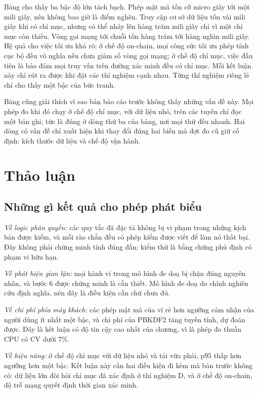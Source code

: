 Bảng cho thấy ba bậc độ lớn tách bạch. Phép mật mã tốn cỡ micro giây tới một mili giây, nên không bao giờ là điểm nghẽn. Truy cập cơ sở dữ liệu tốn vài mili giây khi có chỉ mục, nhưng có thể nhảy lên hàng trăm mili giây chỉ vì một chỉ mục còn thiếu. Vòng gọi mạng tới chuỗi tốn hàng trăm tới hàng nghìn mili giây. Hệ quả cho việc tối ưu khá rõ: ở chế độ on-chain, mọi công sức tối ưu phép tính cục bộ đều vô nghĩa nếu chưa giảm số vòng gọi mạng; ở chế độ chỉ mục, việc đầu tiên là bảo đảm mọi truy vấn trên đường xác minh đều có chỉ mục. Mỗi kết luận này chỉ rút ra được khi đặt các thí nghiệm cạnh nhau. Từng thí nghiệm riêng lẻ chỉ cho thấy một bậc của bức tranh.

Bảng cũng giải thích vì sao bản báo cáo trước không thấy những vấn đề này. Mọi phép đo khi đó chạy ở chế độ chỉ mục, với dữ liệu nhỏ, trên các tuyến chỉ đọc một bản ghi, tức là đúng ở dòng thứ ba của bảng, nơi mọi thứ đều nhanh. Hai dòng có vấn đề chỉ xuất hiện khi thay đổi đúng hai biến mà đợt đo cũ giữ cố định: kích thước dữ liệu và chế độ vận hành.

\section{Thảo luận}
\label{sec:thao-luan}

\subsection{Những gì kết quả cho phép phát biểu}

\textit{Về logic phân quyền:} các quy tắc đã đặc tả không bị vi phạm trong những kịch bản được kiểm, và mỗi rào chắn đều có phép kiểm được viết để làm nó thất bại. Đây không phải chứng minh tính đúng đắn; kiểm thử là bằng chứng phủ định có phạm vi hữu hạn.

\textit{Về phát hiện gian lận:} mọi hành vi trong mô hình đe doạ bị chặn đúng nguyên nhân, và bước 6 được chứng minh là cần thiết. Mô hình đe doạ do chính nghiên cứu định nghĩa, nên đây là điều kiện cần chứ chưa đủ.

\textit{Về chi phí phía máy khách:} các phép mật mã của ví rẻ hơn ngưỡng cảm nhận của người dùng ít nhất một bậc, và chi phí của PBKDF2 tăng tuyến tính, dự đoán được. Đây là kết luận có độ tin cậy cao nhất của chương, vì là phép đo thuần CPU có CV dưới 7\%.

\textit{Về hiệu năng:} ở chế độ chỉ mục với dữ liệu nhỏ và tải vừa phải, p95 thấp hơn ngưỡng hơn một bậc. Kết luận này cần hai điều kiện đi kèm mà bản trước không có: dữ liệu lớn đòi hỏi chỉ mục đã xác định ở thí nghiệm D, và ở chế độ on-chain, độ trễ mạng quyết định thời gian xác minh.

